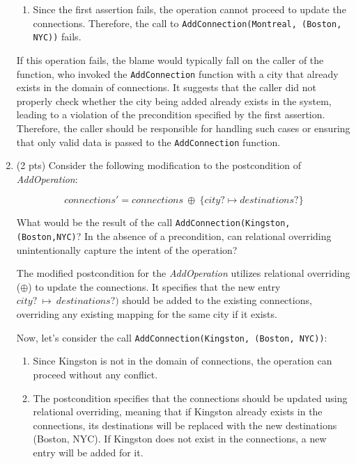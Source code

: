 \documentclass[12pt]{article}
\begin{document}
\begin{spacing}{1.5}
\begin{enumerate}
\begin{enumerate}
                \item Since the first assertion fails, the operation cannot proceed to update the connections. Therefore, the call to \texttt{AddConnection(Montreal, (Boston, NYC))} fails.
            \end{enumerate}

            If this operation fails, the blame would typically fall on the caller of the function, who invoked the \texttt{AddConnection} function with a city that already exists in the domain of connections. It suggests that the caller did not properly check whether the city being added already exists in the system, leading to a violation of the precondition specified by the first assertion. Therefore, the caller should be responsible for handling such cases or ensuring that only valid data is passed to the \texttt{AddConnection} function.
            
		\item (2 pts) Consider the following modification to the postcondition of \textit{AddOperation}:
		      
		      $$connections'=connections \: \oplus \: \{city? \mapsto destinations?\}$$
		      
		      What would be the result of the call \texttt{AddConnection(Kingston, (Boston,NYC)}? In the absence of a precondition, can relational overriding unintentionally capture the intent of the operation? \newline
        
        The modified postcondition for the \textit{AddOperation} utilizes relational overriding ($\oplus$) to update the connections. It specifies that the new entry $city? \: \mapsto \: destinations?)$ should be added to the existing connections, overriding any existing mapping for the same city if it exists.

        Now, let's consider the call \texttt{AddConnection(Kingston, (Boston, NYC))}:

        \begin{enumerate}
            \item Since Kingston is not in the domain of connections, the operation can proceed without any conflict.

            \item The postcondition specifies that the connections should be updated using relational overriding, meaning that if Kingston already exists in the connections, its destinations will be replaced with the new destinations (Boston, NYC). If Kingston does not exist in the connections, a new entry will be added for it.
        \end{enumerate}


\end{enumerate}
\end{spacing}
\end{document}
